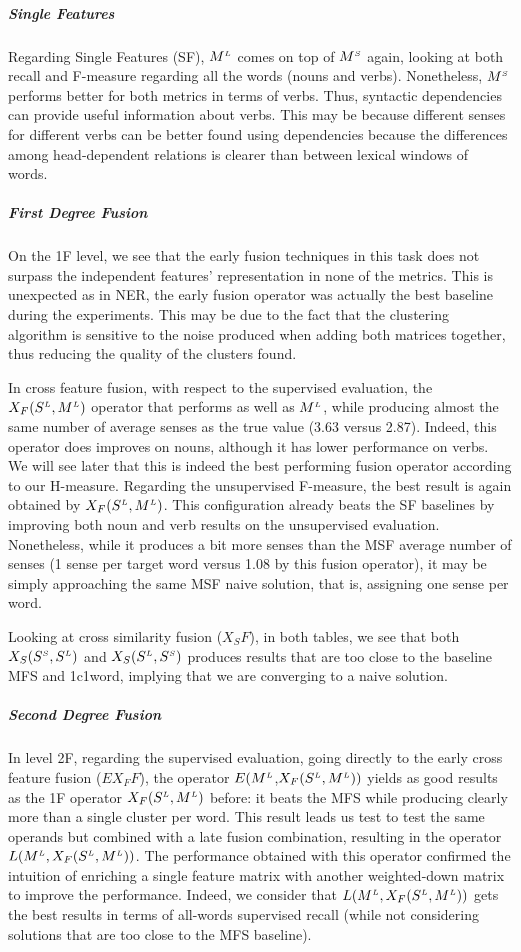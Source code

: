 \subparagraph{Single Features}
Regarding Single Features (SF), $M^{\scriptscriptstyle L}$ comes on top of $M^{\scriptscriptstyle S}$ again, looking at both recall and F-measure regarding all the words (nouns and verbs). Nonetheless, $M^{\scriptscriptstyle S}$ performs better for both metrics in terms of verbs. Thus, syntactic dependencies can provide useful information  about verbs. This may be because different senses for different verbs can be better found using dependencies because the differences among head-dependent relations is clearer than between lexical windows of words. 

\subparagraph{First Degree Fusion}
On the 1F level, we see that the early fusion techniques in this task does not surpass the independent features' representation in none of the metrics. This is unexpected as in NER, the early fusion operator was actually the best baseline during the experiments. This may be due to the fact that the clustering algorithm is sensitive to the noise produced when adding both matrices together, thus reducing the quality of the clusters found. 

In cross feature fusion, with respect to the supervised evaluation, the $X_F(S^{\scriptscriptstyle L},M^{\scriptscriptstyle L})$ operator that performs as well as $M^{\scriptscriptstyle L}$, while producing almost the same number of average senses as the true value (3.63 versus 2.87). Indeed, this operator does improves on nouns, although it has lower performance on verbs. We will see later that this is indeed the best performing fusion operator according to our H-measure.
%
Regarding the unsupervised F-measure, the best result is again obtained by $X_F(S^{\scriptscriptstyle L}, M^{\scriptscriptstyle L})$. This configuration already beats the SF baselines by improving both noun and verb results on the unsupervised evaluation. Nonetheless,  while it produces a bit more senses than the MSF average number of senses (1 sense per target word versus 1.08 by this fusion operator), it may be simply approaching  the same MSF naive solution, that is, assigning one sense per word. 


Looking at cross similarity fusion ($X_SF$), in both tables, we see that both  $X_S(S^{\scriptscriptstyle S},S^{\scriptscriptstyle L})$ and $X_S(S^{\scriptscriptstyle L},S^{\scriptscriptstyle S})$ produces results that are too close to the baseline MFS and 1c1word, implying that we are converging to a naive solution.


\subparagraph{Second Degree Fusion}
In level 2F, regarding the supervised evaluation, going directly to  the early cross feature fusion ($EX_FF$), the operator $E(M^{\scriptscriptstyle L}$,$X_F(S^{\scriptscriptstyle L}, M^{\scriptscriptstyle L}))$ yields as good results as the 1F operator  $X_F(S^{\scriptscriptstyle L}, M^{\scriptscriptstyle L})$ before: it beats the MFS while producing clearly more than a single cluster per word. This result leads us  test to test the same operands but combined with a late fusion combination, resulting in the operator $L(M^{\scriptscriptstyle L}, X_F(S^{\scriptscriptstyle L},M^{\scriptscriptstyle L}))$. The performance obtained with this operator confirmed the intuition of enriching a single feature matrix with another weighted-down matrix to improve the performance. Indeed, we consider that $L(M^{\scriptscriptstyle L}, X_F(S^{\scriptscriptstyle L}, M^{\scriptscriptstyle L}))$ gets the best results in terms of all-words supervised recall (while not considering solutions that are too close to the MFS baseline). 

